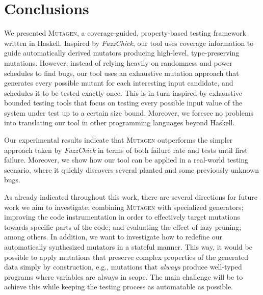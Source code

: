 \documentclass[sigconf, anonymous]{acmart}
\newcommand{\fuzzchick}{\textit{FuzzChick}\xspace}
\newcommand{\mutagen}{\textsc{Mutagen}\xspace}
\begin{document}

\section{Conclusions}
\label{sec:conclusions}

We presented \mutagen, a coverage-guided, property-based testing framework
written in Haskell.
%
Inspired by \fuzzchick, our tool uses coverage information to guide
automatically derived mutators producing high-level, type-preserving mutations.
%
However, instead of relying heavily on randomness and power schedules to find
bugs, our tool uses an exhaustive mutation approach that generates every
possible mutant for each interesting input candidate, and schedules it to be
tested exactly once.
%
This is in turn inspired by exhaustive bounded testing tools that focus on
testing every possible input value of the system under test up to a certain size
bound.
%
Moreover, we foresee no problems into translating our tool in other programming
languages beyond Haskell.



Our experimental results indicate that \mutagen outperforms the simpler approach
taken by \fuzzchick in terms of both failure rate and tests until first failure.
%
Moreover, we show how our tool can be applied in a real-world testing scenario,
where it quickly discovers several planted and some previously unknown bugs.


As already indicated throughout this work, there are several directions for
future work we aim to investigate:
%
combining \mutagen with specialized generators; improving the code
instrumentation in order to effectively target mutations towards specific parts
of the code; and evaluating the effect of lazy pruning; among others.
%
In addition, we want to investigate how to redefine our automatically
synthesized mutators in a stateful manner.
%
This way, it would be possible to apply mutations that preserve complex
properties of the generated data simply by construction, e.g., mutations that
\emph{always} produce well-typed programs where variables are always in scope.
%
The main challenge will be to achieve this while keeping the testing process as
automatable as possible.



\end{document}
